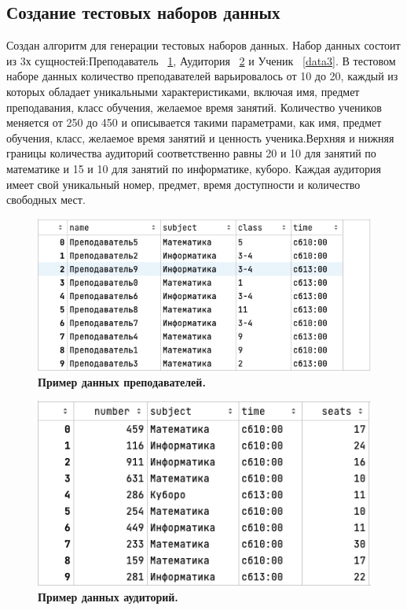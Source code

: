 \subsection{Создание тестовых наборов данных}
\label{PRIMe-SubSecDBSCAN}
Создан алгоритм для генерации тестовых наборов данных. Набор данных состоит из 3х сущностей:Преподаватель ~\ref{data1}, Аудитория ~\ref{data2} и Ученик ~\ref{data3}. В тестовом наборе данных количество преподавателей варьировалось от 10 до 20, каждый из которых обладает уникальными характеристиками, включая имя, предмет преподавания, класс обучения, желаемое время занятий. Количество учеников меняется  от 250 до 450 и  описывается такими параметрами, как имя, предмет обучения, класс, желаемое время занятий и ценность ученика.Верхняя и нижняя границы количества аудиторий соответственно равны  20 и 10 для занятий по математике и 15 и 10 для занятий по информатике, куборо. Каждая аудитория имеет свой уникальный номер, предмет, время доступности и количество свободных мест.
\begin{figure}[!ht]
  \centering
  \includegraphics[width=\linewidth]{Images/data_1.png}
  \caption{\textbf{Пример данных преподавателей.}}
  \label{data1}
\end{figure}
\begin{figure}[!ht]
  \centering
  \includegraphics[width=\linewidth]{Images/data_2.png}
  \caption{\textbf{Пример данных аудиторий.}}
  \label{data2}
\end{figure} 
